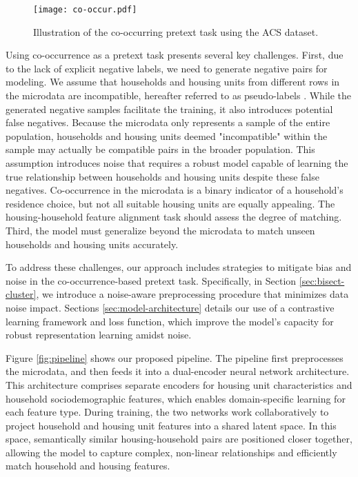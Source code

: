 \documentclass[]{nature_mod}
\begin{document}
\begin{figure}[!ht]
  \centering
  \texttt{[image: co-occur.pdf]}
  \caption{Illustration of the co-occurring pretext task using the ACS dataset.}
  \label{fig:co-occurring}
\end{figure}

Using co-occurrence as a pretext task presents several key challenges. First, due to the lack of explicit negative labels, we need to generate negative pairs for modeling. We assume that households and housing units from different rows in the microdata are incompatible, hereafter referred to as pseudo-labels \cite{jing2020self}. While the generated negative samples facilitate the training, it also introduces potential false negatives. Because the microdata only represents a sample of the entire population, households and housing units deemed "incompatible" within the sample may actually be compatible pairs in the broader population. This assumption introduces noise that requires a robust model capable of learning the true relationship between households and housing units despite these false negatives. Co-occurrence in the microdata is a binary indicator of a household's residence choice, but not all suitable housing units are equally appealing. The housing-household feature alignment task should assess the degree of matching. Third, the model must generalize beyond the microdata to match unseen households and housing units accurately. 

To address these challenges, our approach includes strategies to mitigate bias and noise in the co-occurrence-based pretext task. Specifically, in Section \ref{sec:bisect-cluster}, we introduce a noise-aware preprocessing procedure that minimizes data noise impact. Sections \ref{sec:model-architecture} details our use of a contrastive learning framework and loss function, which improve the model’s capacity for robust representation learning amidst noise. 

Figure \ref{fig:pipeline} shows our proposed pipeline. The pipeline first preprocesses the microdata, and then feeds it into a dual-encoder neural network architecture. This architecture comprises separate encoders for housing unit characteristics and household sociodemographic features, which enables domain-specific learning for each feature type. During training, the two networks work collaboratively to project household and housing unit features into a shared latent space. In this space, semantically similar housing-household pairs are positioned closer together, allowing the model to capture complex, non-linear relationships and efficiently match household and housing features.
\end{document}
